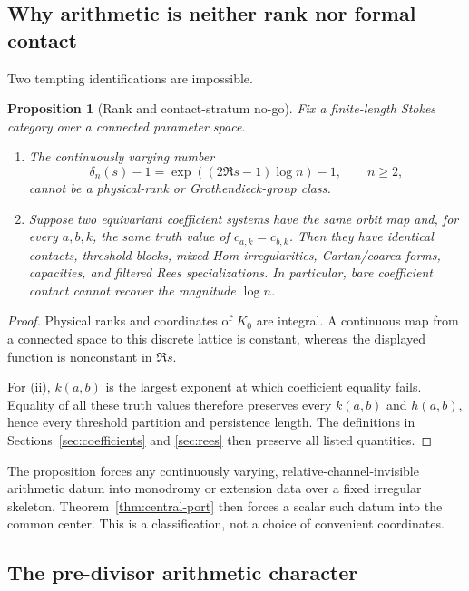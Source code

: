 \documentclass[11pt,a4paper]{amsart}
\theoremstyle{plain}
\newtheorem{proposition}[theorem]{Proposition}
\theoremstyle{definition}
\begin{document}
\subsection{Why arithmetic is neither rank nor formal contact}

Two tempting identifications are impossible.

\begin{proposition}[Rank and contact-stratum no-go]\label{prop:arithmetic-no-go}
Fix a finite-length Stokes category over a connected parameter space.
\begin{enumerate}[label=\textup{(\roman*)}]
\item The continuously varying number
\[
 \delta_n(s)-1=\exp((2\Re s-1)\log n)-1,\qquad n\geq2,
\]
cannot be a physical-rank or Grothendieck-group class.
\item Suppose two equivariant coefficient systems have the same orbit map and, for every
$a,b,k$, the same truth value of $c_{a,k}=c_{b,k}$.  Then they have identical contacts,
threshold blocks, mixed Hom irregularities, Cartan/coarea forms, capacities, and filtered Rees
specializations.  In particular, bare coefficient contact cannot recover the magnitude $\log n$.
\end{enumerate}
\end{proposition}

\begin{proof}
Physical ranks and coordinates of $K_0$ are integral.  A continuous map from a connected space to
this discrete lattice is constant, whereas the displayed function is nonconstant in $\Re s$.

For (ii), $k(a,b)$ is the largest exponent at which coefficient equality fails.  Equality of all
these truth values therefore preserves every $k(a,b)$ and $h(a,b)$, hence every threshold
partition and persistence length.  The definitions in Sections~\ref{sec:coefficients} and
\ref{sec:rees} then preserve all listed quantities.
\end{proof}

The proposition forces any continuously varying, relative-channel-invisible arithmetic datum into
monodromy or extension data over a fixed irregular skeleton.  Theorem~\ref{thm:central-port} then
forces a scalar such datum into the common center.  This is a classification, not a choice of
convenient coordinates.

\subsection{The pre-divisor arithmetic character}
\end{document}

